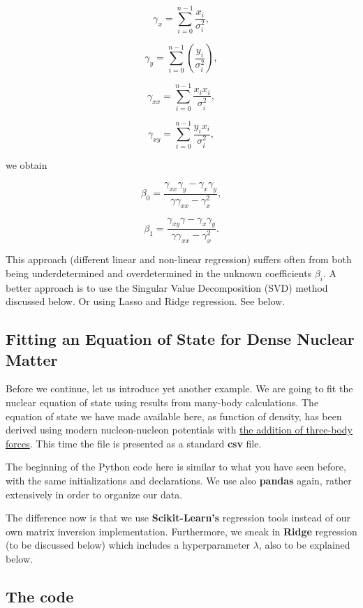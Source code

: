 \documentclass[%
oneside,                 %
final,                   %
10pt]{article}
\begin{document}
\[
\gamma_x =  \sum_{i=0}^{n-1}\frac{x_{i}}{\sigma_i^2},
\]

\[
\gamma_y = \sum_{i=0}^{n-1}\left(\frac{y_i}{\sigma_i^2}\right),
\]

\[
\gamma_{xx} =  \sum_{i=0}^{n-1}\frac{x_ix_{i}}{\sigma_i^2},
\]

\[
\gamma_{xy} = \sum_{i=0}^{n-1}\frac{y_ix_{i}}{\sigma_i^2},
\]

we obtain

\[
\beta_0 = \frac{\gamma_{xx}\gamma_y-\gamma_x\gamma_y}{\gamma\gamma_{xx}-\gamma_x^2},
\]

\[
\beta_1 = \frac{\gamma_{xy}\gamma-\gamma_x\gamma_y}{\gamma\gamma_{xx}-\gamma_x^2}.
\]

This approach (different linear and non-linear regression) suffers
often from both being underdetermined and overdetermined in the
unknown coefficients $\beta_i$.  A better approach is to use the
Singular Value Decomposition (SVD) method discussed below. Or using
Lasso and Ridge regression. See below.




\subsection{Fitting an Equation of State for Dense Nuclear Matter}

Before we continue, let us introduce yet another example. We are going to fit the
nuclear equation of state using results from many-body calculations.
The equation of state we have made available here, as function of
density, has been derived using modern nucleon-nucleon potentials with
\href{{https://www.sciencedirect.com/science/article/pii/S0370157399001106}}{the addition of three-body
forces}. This
time the file is presented as a standard \textbf{csv} file.

The beginning of the Python code here is similar to what you have seen before,
with the same initializations and declarations. We use also \textbf{pandas}
again, rather extensively in order to organize our data.

The difference now is that we use \textbf{Scikit-Learn's} regression tools
instead of our own matrix inversion implementation. Furthermore, we
sneak in \textbf{Ridge} regression (to be discussed below) which includes a
hyperparameter $\lambda$, also to be explained below.

\subsection{The code}
\end{document}
